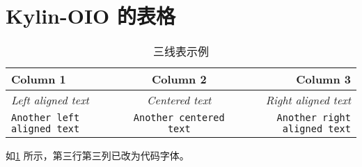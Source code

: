 \documentclass{article}
\begin{document}
\section{ Kylin-OIO 的表格}
    \begin{table}[h]
        \centering
        \begin{tabular}{l c r}
            \toprule
          \textbf{Column 1} & \textbf{Column 2} & \textbf{Column 3} \\
          \midrule
           \textit{Left aligned text}  & \textit{Centered text} & \textit{Right aligned text} \\
           \texttt{Another left aligned text} & \texttt{Another centered text} & \texttt{Another right aligned text}\\
           \bottomrule
        \end{tabular}
        \caption{三线表示例}
        \label{tab:my_table}
    \end{table}

    如\ref{tab:my_table} 所示，第三行第三列已改为代码字体。
\end{document}
